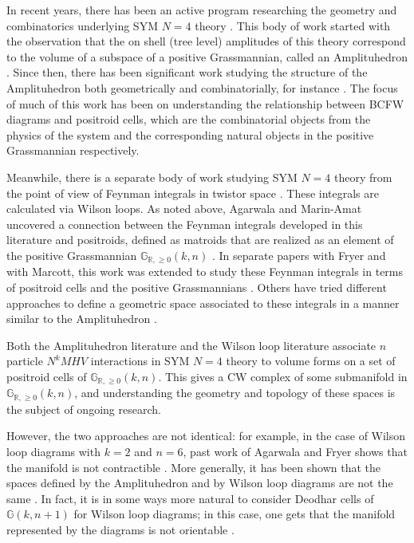 \documentclass[11pt]{article}
\newcommand{\R}{\mathbb{R}}
\newcommand{\Gr}{\mathbb{G}_{\R, \geq 0}}
\theoremstyle{remark}
\theoremstyle{definition}
\begin{document}
In recent years, there has been an active program researching the geometry and combinatorics underlying SYM $N=4$ theory \cite{wilsonloop, Arkani-Hamed:2013jha, Amplituhedronsquared, galashinlam,AmplituhedronDecomposition}. This body of work started with the observation that the on shell (tree level) amplitudes of this theory correspond to the volume of a subspace of a positive Grassmannian, called an Amplituhedron \cite{Arkani-Hamed:2013jha}. Since then, there has been significant work studying the structure of the Amplituhedron both geometrically and combinatorially, for instance \cite{arkani:2012nw, Arkani-Hamed:2013kca, galashinlam,AmplituhedronDecomposition}. The focus of much of this work has been on understanding the relationship between BCFW diagrams and positroid cells, which are the combinatorial objects from the physics of the system and the corresponding natural objects in the positive Grassmannian respectively.

Meanwhile, there is a separate body of work studying SYM $N=4$ theory from the point of view of Feynman integrals in twistor space \cite{Adamo:2011pv, Britto:2005fq, Cachazo:2004kj}. These integrals are calculated via Wilson loops. As noted above, Agarwala and Marin-Amat uncovered a connection between the Feynman integrals developed in this literature and positroids, defined  as matroids that are realized as an element of the positive Grassmannian $\Gr(k,n)$ \cite{wilsonloop}. In separate papers with Fryer and with Marcott, this work was extended to study these Feynman integrals in terms of positroid cells and the positive Grassmannians \cite{casestudy, non-orientable}. Others have tried different approaches to define a geometric space associated to these integrals in a manner similar to the Amplituhedron \cite{Amplituhedronsquared, HeslopStewart}. 

Both the Amplituhedron literature and the Wilson loop literature associate $n$ particle $N^kMHV$ interactions in SYM $N=4$ theory to volume forms on a set of positroid cells of $\Gr(k,n)$. This gives a CW complex of some submanifold in $\Gr(k,n)$, and understanding the geometry and topology of these spaces is the subject of ongoing research. 

However, the two approaches are not identical: for example, in the case of Wilson loop diagrams with $k=2$ and $n=6$, past work of Agarwala and Fryer shows that the manifold is not contractible \cite{casestudy}. More generally, it has been shown that the spaces defined by the Amplituhedron and by Wilson loop diagrams are not the same \cite{Amplituhedronsquared}. In fact, it is in some ways more natural to consider Deodhar cells of $\mathbb{G}(k, n+1)$ for Wilson loop diagrams; in this case, one gets that the manifold represented by the diagrams is not orientable \cite{non-orientable}. 
\end{document}
